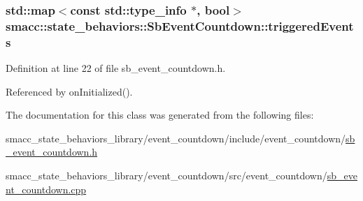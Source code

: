 \subsubsection[{\texorpdfstring{triggered\+Events}{triggeredEvents}}]{\setlength{\rightskip}{0pt plus 5cm}std\+::map$<$const std\+::type\+\_\+info $\ast$, {\bf bool}$>$ smacc\+::state\+\_\+behaviors\+::\+Sb\+Event\+Countdown\+::triggered\+Events\hspace{0.3cm}{\ttfamily [private]}}\hypertarget{classsmacc_1_1state__behaviors_1_1SbEventCountdown_ab921590a06b23ecbabecc9378040a667}{}\label{classsmacc_1_1state__behaviors_1_1SbEventCountdown_ab921590a06b23ecbabecc9378040a667}


Definition at line 22 of file sb\+\_\+event\+\_\+countdown.\+h.



Referenced by on\+Initialized().



The documentation for this class was generated from the following files\+:\begin{DoxyCompactItemize}
\item 
smacc\+\_\+state\+\_\+behaviors\+\_\+library/event\+\_\+countdown/include/event\+\_\+countdown/\hyperlink{sb__event__countdown_8h}{sb\+\_\+event\+\_\+countdown.\+h}\item 
smacc\+\_\+state\+\_\+behaviors\+\_\+library/event\+\_\+countdown/src/event\+\_\+countdown/\hyperlink{sb__event__countdown_8cpp}{sb\+\_\+event\+\_\+countdown.\+cpp}\end{DoxyCompactItemize}
